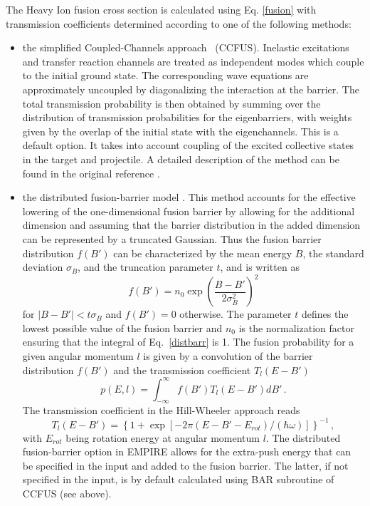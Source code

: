 \documentclass[twocolumn,amsmath,amssymb,10pt,groupedaddress,a4paper]{revtex4}
\begin{document}
The Heavy Ion fusion cross section is calculated using Eq. \ref{fusion}
with transmission coefficients determined according to one of the
following methods:
\begin{itemize}
\item the simplified Coupled-Channels
approach~\cite{CCFUS} (CCFUS). Inelastic excitations
and transfer reaction channels are treated as independent modes which
couple to the initial ground state. The corresponding wave equations
are approximately uncoupled by diagonalizing the interaction at the
barrier. The total transmission probability is then obtained by summing
over the distribution of transmission probabilities for the eigenbarriers,
with weights given by the overlap of the initial state with the eigenchannels.
This is a default option. It takes into account coupling of the excited
collective states in the target and projectile. A detailed description
of the method can be found in the original reference \cite{CCFUS}.

\item the distributed fusion-barrier
model \cite{difusb}. This method accounts for the effective lowering
of the one-dimensional fusion barrier by allowing for the additional
dimension and assuming that the barrier distribution in the added
dimension can be represented by a truncated Gaussian. Thus the fusion
barrier distribution $f(B')$ can be characterized by the mean energy
$B$, the standard deviation $\sigma_{B}$, and the truncation parameter
$t$, and is written as
\begin{equation}
f(B')=n_{0}\exp\left(\frac{B-B'}{2\sigma_{B}^{2}}\right)^{2} \label{distbarr}
\end{equation}
\noindent for $\left|B-B'\right|<t\sigma_{B}$ and $f(B')=0$ otherwise. The
parameter $t$ defines the lowest possible value of the fusion barrier
and $n_{0}$ is the normalization factor ensuring that the integral
of Eq.~\ref{distbarr} is 1. The fusion probability for a given angular
momentum $l$ is given by a convolution of the barrier distribution
$f(B')$ and the transmission coefficient $T_{l}(E-B')$
\begin{equation}
p(E,l)=\int_{-\infty}^{\infty}f(B')T_{l}(E-B')dB'\,.
\end{equation}
\noindent The transmission coefficient in the Hill-Wheeler
approach \cite{HillWheeler} reads
\begin{equation}
T_{l}(E-B')=\left\{ 1+\exp\left[-2\pi(E-B'-E_{rot})/(\hbar\omega)\right]\right\} ^{-1}\,,
\end{equation}
\noindent with $E_{rot}$ being rotation energy at angular momentum $l$. The
distributed fusion-barrier option
in EMPIRE allows for the extra-push energy that can be specified in
the input and added to the fusion barrier. The latter, if not specified
in the input, is by default calculated using BAR subroutine of CCFUS
(see above).


\end{itemize}
\end{document}
